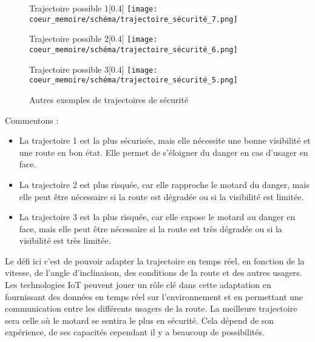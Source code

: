 \begin{figure}[H]
  \centering
  
  \begin{subcaptionbox}{Trajectoire possible 1\label{fig:img1}}[0.4\linewidth]
    {\texttt{[image: coeur\_memoire/schéma/trajectoire\_sécurité\_7.png]}}
  \end{subcaptionbox}
  \hfill
  \begin{subcaptionbox}{Trajectoire possible 2\label{fig:img2}}[0.4\linewidth]
    {\texttt{[image: coeur\_memoire/schéma/trajectoire\_sécurité\_6.png]}}
  \end{subcaptionbox}
  
  \vspace{0.5cm}
  
  \begin{subcaptionbox}{Trajectoire possible 3\label{fig:img3}}[0.4\linewidth]
    {\texttt{[image: coeur\_memoire/schéma/trajectoire\_sécurité\_5.png]}}
  \end{subcaptionbox}
  
  \caption{Autres exemples de trajectoires de sécurité}
  \label{fig:mosaique}
\end{figure}

Commentons :\
\begin{itemize}
    \item La trajectoire 1 est la plus sécurisée, mais elle nécessite une bonne visibilité et une route en bon état. Elle permet de s'éloigner du danger en cas d'usager en face.
    \item La trajectoire 2 est plus risquée, car elle rapproche le motard du danger, mais elle peut être nécessaire si la route est dégradée ou si la visibilité est limitée.
    \item La trajectoire 3 est la plus risquée, car elle expose le motard au danger en face, mais elle peut être nécessaire si la route est très dégradée ou si la visibilité est très limitée.
\end{itemize}

Le défi ici c'est de pouvoir adapter la trajectoire en temps réel, en fonction de la vitesse, de l'angle d'inclinaison, des conditions de la route et des autres usagers. Les technologies IoT peuvent jouer un rôle clé dans cette adaptation en fournissant des données en temps réel sur l'environnement et en permettant une communication entre les différents usagers de la route. La meilleure trajectoire sera celle où le motard se sentira le plus  en sécurité. Cela dépend de son expérience, de ses capacités cependant il y a beaucoup de possibilités.

